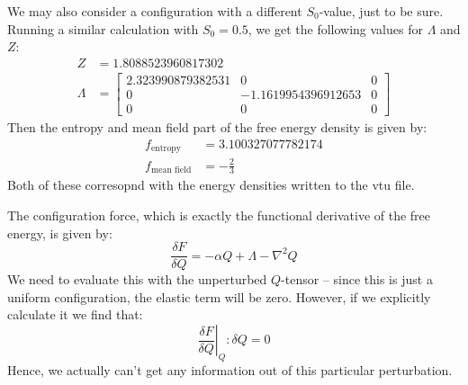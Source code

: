 \documentclass[reqno]{article}
\begin{document}
We may also consider a configuration with a different $S_0$-value, just to be sure.
Running a similar calculation with $S_0 = 0.5$, we get the following values for $\Lambda$ and $Z$:
\begin{equation}
    \begin{split}
        Z &= 1.8088523960817302 \\
        \Lambda &= 
        \begin{bmatrix}
            2.323990879382531 &0 &0 \\
            0 &-1.1619954396912653 &0 \\
            0 &0 &0
        \end{bmatrix}
    \end{split}
\end{equation}
Then the entropy and mean field part of the free energy density is given by:
\begin{equation}
    \begin{split}
        f_\text{entropy} &= 3.100327077782174 \\
        f_\text{mean field} &= -\frac{2}{3}
    \end{split}
\end{equation}
Both of these corresopnd with the energy densities written to the vtu file.

The configuration force, which is exactly the functional derivative of the free energy, is given by:
\begin{equation}
    \frac{\delta F}{\delta Q}
    =
    -\alpha Q
    + \Lambda
    - \nabla^2 Q
\end{equation}
We need to evaluate this with the unperturbed $Q$-tensor -- since this is just a uniform configuration, the elastic term will be zero.
However, if we explicitly calculate it we find that:
\begin{equation}
    \left. \frac{\delta F}{\delta Q} \right|_Q : \delta Q = 0
\end{equation}
Hence, we actually can't get any information out of this particular perturbation.
\end{document}
